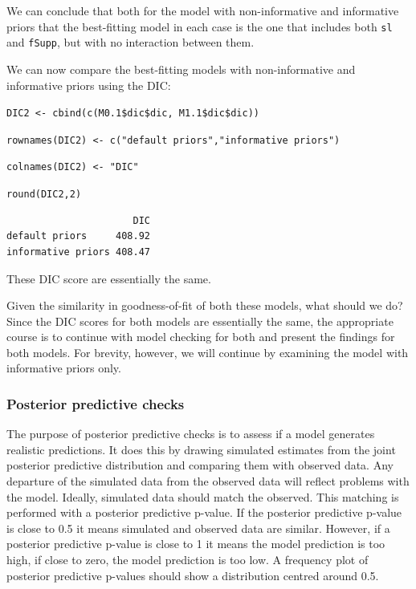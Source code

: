 \documentclass[
]{book}
\begin{document}
We can conclude that both for the model with non-informative and informative priors that the best-fitting model in each case is the one that includes both \texttt{sl} and \texttt{fSupp}, but with no interaction between them.

We can now compare the best-fitting models with non-informative and informative priors using the DIC:

\texttt{DIC2\ \textless{}-\ cbind(c(M0.1\$dic\$dic,\ M1.1\$dic\$dic))}

\texttt{rownames(DIC2)\ \textless{}-\ c("default\ priors","informative\ priors")}

\texttt{colnames(DIC2)\ \textless{}-\ "DIC"}

\texttt{round(DIC2,2)}

\begin{verbatim}
                      DIC
default priors     408.92
informative priors 408.47
\end{verbatim}

These DIC score are essentially the same.

Given the similarity in goodness-of-fit of both these models, what should we do? Since the DIC scores for both models are essentially the same, the appropriate course is to continue with model checking for both and present the findings for both models. For brevity, however, we will continue by examining the model with informative priors only.

\hypertarget{posterior-predictive-checks}{%
\subsubsection{Posterior predictive checks}\label{posterior-predictive-checks}}

The purpose of posterior predictive checks is to assess if a model generates realistic predictions. It does this by drawing simulated estimates from the joint posterior predictive distribution and comparing them with observed data. Any departure of the simulated data from the observed data will reflect problems with the model. Ideally, simulated data should match the observed. This matching is performed with a posterior predictive p-value. If the posterior predictive p-value is close to 0.5 it means simulated and observed data are similar. However, if a posterior predictive p-value is close to 1 it means the model prediction is too high, if close to zero, the model prediction is too low. A frequency plot of posterior predictive p-values should show a distribution centred around 0.5.
\end{document}
